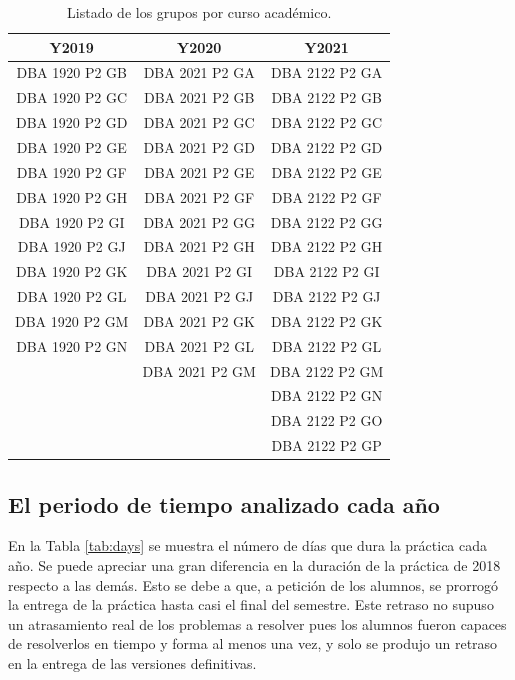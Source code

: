 \begin{table}[H]
\centering
\caption{Listado de los grupos por curso académico.}
\label{tab:groups2}
\begin{tabular}{ccc}
\hline
\textbf{Y2019} & \textbf{Y2020} & \textbf{Y2021} \\ \hline
DBA 1920 P2 GB & DBA 2021 P2 GA & DBA 2122 P2 GA \\
DBA 1920 P2 GC & DBA 2021 P2 GB & DBA 2122 P2 GB \\
DBA 1920 P2 GD & DBA 2021 P2 GC & DBA 2122 P2 GC \\
DBA 1920 P2 GE & DBA 2021 P2 GD & DBA 2122 P2 GD \\
DBA 1920 P2 GF & DBA 2021 P2 GE & DBA 2122 P2 GE \\
DBA 1920 P2 GH & DBA 2021 P2 GF & DBA 2122 P2 GF \\
DBA 1920 P2 GI & DBA 2021 P2 GG & DBA 2122 P2 GG \\
DBA 1920 P2 GJ & DBA 2021 P2 GH & DBA 2122 P2 GH \\
DBA 1920 P2 GK & DBA 2021 P2 GI & DBA 2122 P2 GI \\
DBA 1920 P2 GL & DBA 2021 P2 GJ & DBA 2122 P2 GJ \\
DBA 1920 P2 GM & DBA 2021 P2 GK & DBA 2122 P2 GK \\
DBA 1920 P2 GN & DBA 2021 P2 GL & DBA 2122 P2 GL \\
			   & DBA 2021 P2 GM & DBA 2122 P2 GM \\
			   &         		& DBA 2122 P2 GN \\
			   & 				& DBA 2122 P2 GO \\
			   &				& DBA 2122 P2 GP \\ \hline
\end{tabular}
\end{table}

\subsection{El periodo de tiempo analizado cada año}

En la Tabla \ref{tab:days} se muestra el número de días que dura la práctica cada año. Se puede apreciar una gran diferencia en la duración de la práctica de 2018 respecto a las demás. Esto se debe a que, a petición de los alumnos, se prorrogó la entrega de la práctica hasta casi el final del semestre. Este retraso no supuso un atrasamiento real de los problemas a resolver pues los alumnos fueron capaces de resolverlos en tiempo y forma al menos una vez, y solo se produjo un retraso en la entrega de las versiones definitivas.


